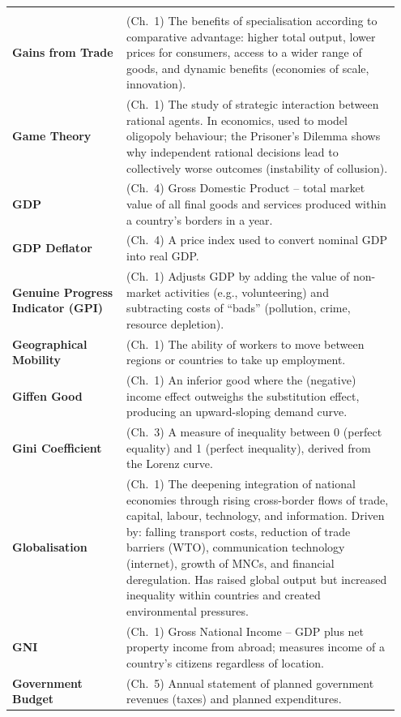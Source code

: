 \documentclass[11pt, a4paper, twoside]{book}
\begin{document}
\begin{longtable}{@{}>{\RaggedRight\arraybackslash}p{0.28\linewidth}>{\RaggedRight\arraybackslash}p{0.67\linewidth}@{}}
\multicolumn{2}{@{}l}{\textbf{\Large\color{CurveNavy} G}} \\[2pt]
\textbf{Gains from Trade} & (Ch.~1) The benefits of specialisation according to comparative advantage: higher total output, lower prices for consumers, access to a wider range of goods, and dynamic benefits (economies of scale, innovation). \\
\textbf{Game Theory} & (Ch.~1) The study of strategic interaction between rational agents. In economics, used to model oligopoly behaviour; the Prisoner's Dilemma shows why independent rational decisions lead to collectively worse outcomes (instability of collusion). \\
\textbf{GDP} & (Ch.~4) Gross Domestic Product -- total market value of all final goods and services produced within a country's borders in a year. \\
\textbf{GDP Deflator} & (Ch.~4) A price index used to convert nominal GDP into real GDP. \\
\textbf{Genuine Progress Indicator (GPI)} & (Ch.~1) Adjusts GDP by adding the value of non-market activities (e.g., volunteering) and subtracting costs of ``bads'' (pollution, crime, resource depletion). \\
\textbf{Geographical Mobility} & (Ch.~1) The ability of workers to move between regions or countries to take up employment. \\
\textbf{Giffen Good} & (Ch.~1) An inferior good where the (negative) income effect outweighs the substitution effect, producing an upward-sloping demand curve. \\
\textbf{Gini Coefficient} & (Ch.~3) A measure of inequality between 0 (perfect equality) and 1 (perfect inequality), derived from the Lorenz curve. \\
\textbf{Globalisation} & (Ch.~1) The deepening integration of national economies through rising cross-border flows of trade, capital, labour, technology, and information. Driven by: falling transport costs, reduction of trade barriers (WTO), communication technology (internet), growth of MNCs, and financial deregulation. Has raised global output but increased inequality within countries and created environmental pressures. \\
\textbf{GNI} & (Ch.~1) Gross National Income -- GDP plus net property income from abroad; measures income of a country's citizens regardless of location. \\
\textbf{Government Budget} & (Ch.~5) Annual statement of planned government revenues (taxes) and planned expenditures. \\

\end{longtable}
\end{document}

